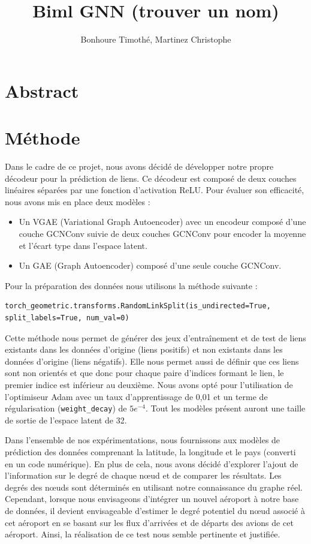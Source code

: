 \documentclass{article}
\begin{document}
\title{Biml GNN (trouver un nom)}
\author{Bonhoure Timothé, Martinez Christophe}                      %

\maketitle
\tableofcontents
\section*{Abstract}
\newpage

\section{Méthode}

Dans le cadre de ce projet, nous avons décidé de développer notre propre décodeur pour la prédiction de liens. Ce décodeur est composé de deux couches linéaires séparées par une fonction d'activation ReLU. Pour évaluer son efficacité, nous avons mis en place deux modèles :
\begin{itemize}
    \item Un VGAE (Variational Graph Autoencoder) avec un encodeur composé d'une couche GCNConv suivie de deux couches GCNConv pour encoder la moyenne et l'écart type dans l'espace latent.
    \item Un GAE (Graph Autoencoder) composé d'une seule couche GCNConv.
\end{itemize}
Pour la préparation des données nous utilisons la méthode suivante :
\begin{verbatim}
torch_geometric.transforms.RandomLinkSplit(is_undirected=True, split_labels=True, num_val=0)
\end{verbatim}
Cette méthode nous permet de générer des jeux d’entraînement et de test de liens existants dans les données d'origine (liens positifs) et non existants dans les données d'origine (liens négatifs). Elle nous permet aussi de définir que ces liens sont non orientés et que donc pour chaque paire d’indices formant le lien, le premier indice est inférieur au deuxième.
Nous avons opté pour l'utilisation de l'optimiseur Adam avec un taux d'apprentissage de 0,01 et un terme de régularisation (\texttt{weight\_decay}) de \(5e^{-4}\).
Tout les modèles présent auront une taille de sortie de l'espace latent de 32.

Dans l'ensemble de nos expérimentations, nous fournissons aux modèles de prédiction des données comprenant la latitude, la longitude et le pays (converti en un code numérique). En plus de cela, nous avons décidé d'explorer l'ajout de l'information sur le degré de chaque nœud et de comparer les résultats.
Les degrés des nœuds sont déterminés en utilisant notre connaissance du graphe réel. Cependant, lorsque nous envisageons d'intégrer un nouvel aéroport à notre base de données, il devient envisageable d'estimer le degré potentiel du nœud associé à cet aéroport en se basant sur les flux d'arrivées et de départs des avions de cet aéroport. Ainsi, la réalisation de ce test nous semble pertinente et justifiée.
\end{document}

